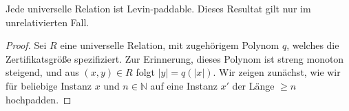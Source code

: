 \begin{observation}
    Jede universelle Relation ist Levin-paddable. Dieses Resultat gilt nur im unrelativierten Fall.
\end{observation}
\begin{proof}
    Sei $R$ eine universelle Relation, mit zugehörigem Polynom $q$, welches die Zertifikatsgröße spezifiziert. Zur Erinnerung, dieses Polynom ist streng monoton steigend, und aus $(x,y)\in R$ folgt $|y|=q(|x|)$.
    Wir zeigen zunächst, wie wir für beliebige Instanz $x$ und $n\in\mathbb N$ auf eine Instanz $x'$ der Länge $\geq n$ hochpadden.





\end{proof}
